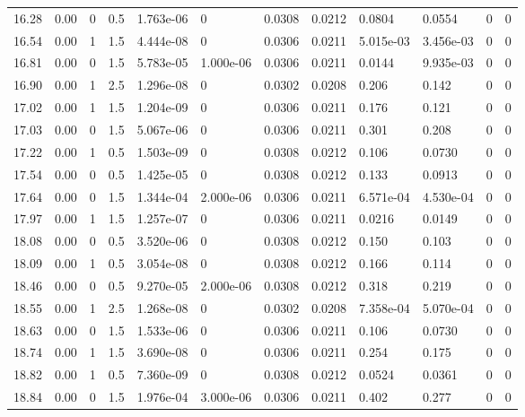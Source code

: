 \documentclass[preview]{standalone}
\begin{document}
{{{{\begin{tabular}{L{1.2cm}C{1.2cm} C{0.3cm}C{0.5cm} C{1.4cm}C{1.4cm} C{1.4cm}C{1.4cm} C{1.6cm}C{1.6cm} C{1.6cm}C{1.6cm}}
  16.28  &  0.00  & 0     & 0.5 &  1.763e-06  & 0  &  0.0308&   0.0212& 0.0804 & 0.0554   &  0 & 0  \\ 
  16.54  &  0.00  & 1     & 1.5 &  4.444e-08  & 0  &  0.0306&   0.0211& 5.015e-03 & 3.456e-03   &  0 & 0  \\ 
  16.81  &  0.00  & 0     & 1.5 &  5.783e-05  & 1.000e-06  &  0.0306&   0.0211& 0.0144 & 9.935e-03   &  0 & 0  \\ 
  16.90  &  0.00  & 1     & 2.5 &  1.296e-08  & 0  &  0.0302&   0.0208& 0.206 & 0.142   &  0 & 0  \\ 
  17.02  &  0.00  & 1     & 1.5 &  1.204e-09  & 0  &  0.0306&   0.0211& 0.176 & 0.121   &  0 & 0  \\ 
  17.03  &  0.00  & 0     & 1.5 &  5.067e-06  & 0  &  0.0306&   0.0211& 0.301 & 0.208   &  0 & 0  \\ 
  17.22  &  0.00  & 1     & 0.5 &  1.503e-09  & 0  &  0.0308&   0.0212& 0.106 & 0.0730   &  0 & 0  \\ 
  17.54  &  0.00  & 0     & 0.5 &  1.425e-05  & 0  &  0.0308&   0.0212& 0.133 & 0.0913   &  0 & 0  \\ 
  17.64  &  0.00  & 0     & 1.5 &  1.344e-04  & 2.000e-06  &  0.0306&   0.0211& 6.571e-04 & 4.530e-04   &  0 & 0  \\ 
  17.97  &  0.00  & 1     & 1.5 &  1.257e-07  & 0  &  0.0306&   0.0211& 0.0216 & 0.0149   &  0 & 0  \\ 
  18.08  &  0.00  & 0     & 0.5 &  3.520e-06  & 0  &  0.0308&   0.0212& 0.150 & 0.103   &  0 & 0  \\ 
  18.09  &  0.00  & 1     & 0.5 &  3.054e-08  & 0  &  0.0308&   0.0212& 0.166 & 0.114   &  0 & 0  \\ 
  18.46  &  0.00  & 0     & 0.5 &  9.270e-05  & 2.000e-06  &  0.0308&   0.0212& 0.318 & 0.219   &  0 & 0  \\ 
  18.55  &  0.00  & 1     & 2.5 &  1.268e-08  & 0  &  0.0302&   0.0208& 7.358e-04 & 5.070e-04   &  0 & 0  \\ 
  18.63  &  0.00  & 0     & 1.5 &  1.533e-06  & 0  &  0.0306&   0.0211& 0.106 & 0.0730   &  0 & 0  \\ 
  18.74  &  0.00  & 1     & 1.5 &  3.690e-08  & 0  &  0.0306&   0.0211& 0.254 & 0.175   &  0 & 0  \\ 
  18.82  &  0.00  & 1     & 0.5 &  7.360e-09  & 0  &  0.0308&   0.0212& 0.0524 & 0.0361   &  0 & 0  \\ 
  18.84  &  0.00  & 0     & 1.5 &  1.976e-04  & 3.000e-06  &  0.0306&   0.0211& 0.402 & 0.277   &  0 & 0  \\ 

\end{tabular}}}}}
\end{document}
